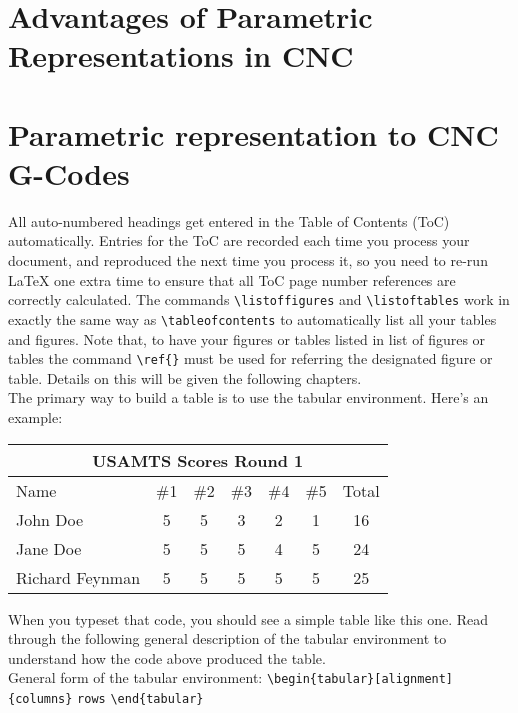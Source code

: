 \section{Advantages of Parametric Representations in CNC}



\section{Parametric representation to CNC G-Codes}






All auto-numbered headings get entered in the Table of Contents (ToC) automatically. Entries for the ToC are recorded each time you process your document, and reproduced the next time you process it, so you need to re-run {\LaTeX} one extra time to ensure that all ToC page number references are correctly calculated. The commands \verb+\listoffigures+ and \verb+\listoftables+ work in exactly the same way as \verb+\tableofcontents+ to automatically list all your tables and figures. Note that, to have your figures or tables listed in list of figures or tables the command \verb+\ref{}+ must be used for referring the designated figure or table. Details on this will be given the following chapters.\\

The primary way to build a table is to use the tabular environment. Here's an example:

\begin{tabular}[t]{|l|ccccc|c|}
\multicolumn{7}{c}{USAMTS Scores Round 1}\\\hline
Name&\#1&\#2&\#3&\#4&\#5&Total\\\hline
John Doe&5&5&3&2&1&16\\
Jane Doe&5&5&5&4&5&24\\
Richard Feynman&5&5&5&5&5&25\\\hline
\end{tabular}

When you typeset that code, you should see a simple table like this one. Read through the following general description of the tabular environment to understand how the code above produced the table.\\

General form of the tabular environment:
\verb+\begin{tabular}[alignment]{columns}+
\verb+rows+
\verb+\end{tabular}+\\

